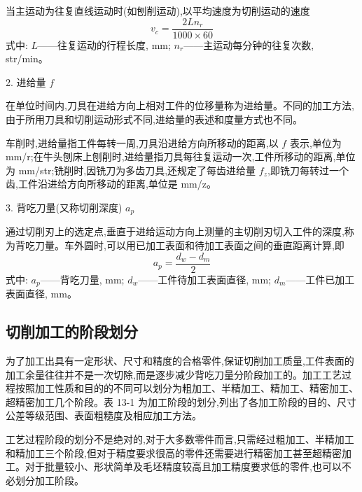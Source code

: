 \documentclass[UTF8]{ctexbook}
\newcommand{\◎}{\ensuremath{\bigcirc}}
\begin{document}
当主运动为往复直线运动时(如刨削运动),以平均速度为切削运动的速度
\begin{equation}
v_c = \frac{2 L n_r}{1000 \times 60}
\end{equation}
式中: $L$——往复运动的行程长度, mm;
$n_r$——主运动每分钟的往复次数, str/min。

2. 进给量 $f$

在单位时间内,刀具在进给方向上相对工件的位移量称为进给量。不同的加工方法,由于所用刀具和切削运动形式不同,进给量的表述和度量方式也不同。

车削时,进给量指工件每转一周,刀具沿进给方向所移动的距离,以 $f$ 表示,单位为 mm/r;在牛头刨床上刨削时,进给量指刀具每往复运动一次,工件所移动的距离,单位为 mm/str;铣削时,因铣刀为多齿刀具,还规定了每齿进给量 $f_z$,即铣刀每转过一个齿,工件沿进给方向所移动的距离,单位是 mm/z。

3. 背吃刀量(又称切削深度) $a_p$

通过切削刃上的选定点,垂直于进给运动方向上测量的主切削刃切入工件的深度,称为背吃刀量。车外圆时,可以用已加工表面和待加工表面之间的垂直距离计算,即
\begin{equation}
a_p = \frac{d_w - d_m}{2}
\end{equation}
式中: $a_p$——背吃刀量, mm;
$d_w$——工件待加工表面直径, mm;
$d_m$——工件已加工表面直径, mm。

\subsection{切削加工的阶段划分}

为了加工出具有一定形状、尺寸和精度的合格零件,保证切削加工质量,工件表面的加工余量往往并不是一次切除,而是逐步减少背吃刀量分阶段加工的。加工工艺过程按照加工性质和目的的不同可以划分为粗加工、半精加工、精加工、精密加工、超精密加工几个阶段。表 13-1 为加工阶段的划分,列出了各加工阶段的目的、尺寸公差等级范围、表面粗糙度及相应加工方法。

工艺过程阶段的划分不是绝对的,对于大多数零件而言,只需经过粗加工、半精加工和精加工三个阶段,但对于精度要求很高的零件还需要进行精密加工甚至超精密加工。对于批量较小、形状简单及毛坯精度较高且加工精度要求低的零件,也可以不必划分加工阶段。
\end{document}
